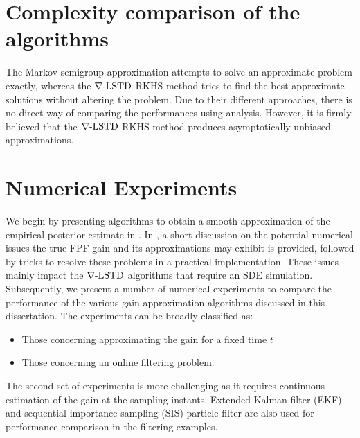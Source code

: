 \section{Complexity comparison of the algorithms}
\label{s:computational_complexity}
The Markov semigroup approximation attempts to solve an approximate problem exactly, whereas the $\nabla\text{-LSTD}$-RKHS method tries to find the best approximate solutions without altering the problem. Due to their different approaches, there is no direct way of comparing the performances using analysis. However, it is firmly believed that the $\nabla\text{-LSTD}$-RKHS method produces asymptotically unbiased approximations.

\section{Numerical Experiments}
\label{s:fpf_numerics}
We begin by presenting algorithms to obtain a smooth approximation of the empirical posterior estimate in . In , a short discussion on the potential numerical issues the true FPF gain and its approximations may exhibit is provided, followed by tricks to resolve these problems in a practical implementation. These issues mainly impact the $\nabla\text{-LSTD}$ algorithms that require an SDE simulation. Subsequently, we present a number of numerical experiments to compare the performance of the various gain approximation algorithms discussed in this dissertation. The experiments can be broadly classified as:
\begin{itemize}
 \item Those concerning approximating the gain for a fixed time $t$ 
 \item Those concerning an online filtering problem. 
\end{itemize}
The second set of experiments is more challenging as it requires continuous estimation of the gain at the sampling instants. Extended Kalman filter (EKF) and sequential importance sampling (SIS) particle filter are also used for performance comparison in the filtering examples.  
